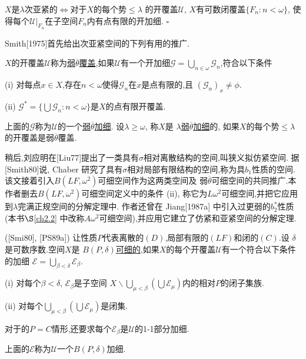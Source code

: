 \documentclass[main.tex]{subfiles}
\begin{document}
\begin{corollary}
$X$是$\lambda$次亚紧的$\Leftrightarrow$对于$X$的每个势$\le\lambda$
的开覆盖$\mathscr{U}$, $X$有可数闭覆盖$\{F_n:n<\omega\}$,
使得每个$\mathscr{U}|_{F_n}$在子空间$F_n$内有点有限的开加细. $\square$
\end{corollary}

Smith[1975]首先给出次亚紧空间的下列有用的推广.

\begin{definition}
$X$的开覆盖$\mathscr{U}$称为\underline{弱$\overline{\theta}$覆盖},如果$\mathscr{U}$有一个开加细$\mathscr{G}=\bigcup_{n\in\omega}\mathscr{G}_n$,符合以下条件

\textnormal{(i)} 对每点$x\in X$,存在$n<\omega$使得$\mathscr{G}_n$在$x$是点有限的,且
$(\mathscr{G}_n)_x \ne \phi$.

\textnormal{(ii)} $\mathscr{G}^* =\{\bigcup \mathscr{G}_n: n<\omega\}$是$X$的点有限开覆盖.

上面的$\mathscr{G}$称为$\mathscr{U}$的一个\underline{弱$\overline{\theta}$加细}.
设$\lambda\ge\omega$, 称$X$是 \underline{$\lambda$弱$\overline{\theta}$加细}的,
如果$X$的每个势$\le\lambda$的开覆盖是弱$\overline{\theta}$覆盖.
\end{definition}

稍后,刘应明在[Liu77]提出了一类具有$\sigma$相对离散结构的空间,叫狭义拟仿紧空间.
据[Smith80]说, Chaber 研究了具有$\sigma$相对局部有限结构的空间,称为具$b_1$性质的空间.
该文接着引入$B(LF,\omega^2)$可细空间作为这两类空间及
弱$\overline{\theta}$可细空间的共同推广.本作者删去$B(LF,\omega^2)$可细空间定义中的条件
 (ii), 称它为$L\omega^2$可细空间,并把它应用到$\lambda$完满正规空间的分解定理中.
 作者还曾在 Jiang[1987a] 中引入过更弱的$b_2^*$性质(本书$\S$\ref{ch2.2} 中改称$A\omega^2$可细空间),并应用它建立了仿紧和亚紧空间的分解定理.

\begin{definition}\label{def1.2.3}
\textnormal{([Smi80], [PS89a])}	让性质$P$代表离散的$(D)$,局部有限的$(LF)$和闭的$(C)$.设
$\delta$是可数序数.空间$X$是
\underline{$B(P,\delta)$可细的},如果$X$的每个开覆盖$\mathscr{U}$有一个符合以下条件的加细
$\mathscr{E}=\bigcup_{\beta<\delta}\mathscr{E}_\beta$.

\textnormal{(i)} 对每个$\beta<\delta$, $\mathscr{E}_\beta$是子空间
$X\backslash\bigcup_{\mu<\beta}(\bigcup\mathscr{E}_\mu)$内的相对$P$的闭子集族.

\textnormal{(ii)} 对每个$\bigcup_{\mu<\beta}(\bigcup\mathscr{E}_\mu)$是闭集.

对于的$P=C$情形,还要求每个$\mathscr{E}_\beta$是$\mathscr{U}$的\textnormal{1-1}部分加细.

上面的$\mathscr{E}$称为$\mathscr{U}$一个$B(P,\delta)$加细.
\end{definition}
	
\end{document}

